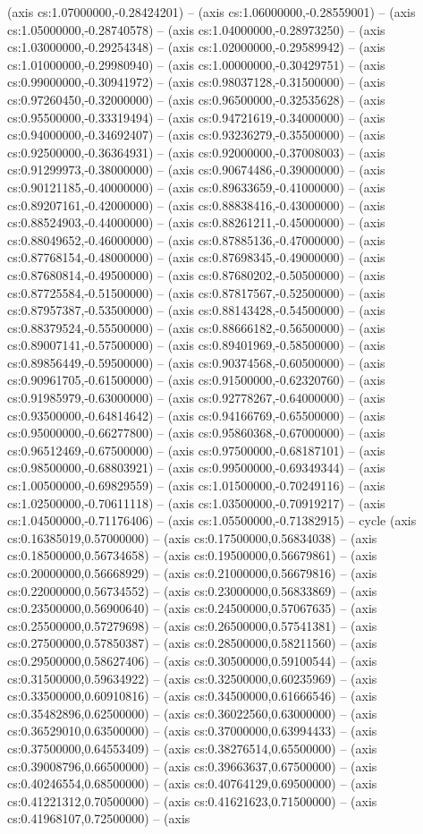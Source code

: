 (axis cs:1.07000000,-0.28424201) -- (axis cs:1.06000000,-0.28559001) -- (axis cs:1.05000000,-0.28740578) -- (axis cs:1.04000000,-0.28973250) -- (axis cs:1.03000000,-0.29254348) -- (axis cs:1.02000000,-0.29589942) -- (axis cs:1.01000000,-0.29980940) -- (axis cs:1.00000000,-0.30429751) -- (axis cs:0.99000000,-0.30941972) -- (axis cs:0.98037128,-0.31500000) -- (axis cs:0.97260450,-0.32000000) -- (axis cs:0.96500000,-0.32535628) -- (axis cs:0.95500000,-0.33319494) -- (axis cs:0.94721619,-0.34000000) -- (axis cs:0.94000000,-0.34692407) -- (axis cs:0.93236279,-0.35500000) -- (axis cs:0.92500000,-0.36364931) -- (axis cs:0.92000000,-0.37008003) -- (axis cs:0.91299973,-0.38000000) -- (axis cs:0.90674486,-0.39000000) -- (axis cs:0.90121185,-0.40000000) -- (axis cs:0.89633659,-0.41000000) -- (axis cs:0.89207161,-0.42000000) -- (axis cs:0.88838416,-0.43000000) -- (axis cs:0.88524903,-0.44000000) -- (axis cs:0.88261211,-0.45000000) -- (axis cs:0.88049652,-0.46000000) -- (axis cs:0.87885136,-0.47000000) -- (axis cs:0.87768154,-0.48000000) -- (axis cs:0.87698345,-0.49000000) -- (axis cs:0.87680814,-0.49500000) -- (axis cs:0.87680202,-0.50500000) -- (axis cs:0.87725584,-0.51500000) -- (axis cs:0.87817567,-0.52500000) -- (axis cs:0.87957387,-0.53500000) -- (axis cs:0.88143428,-0.54500000) -- (axis cs:0.88379524,-0.55500000) -- (axis cs:0.88666182,-0.56500000) -- (axis cs:0.89007141,-0.57500000) -- (axis cs:0.89401969,-0.58500000) -- (axis cs:0.89856449,-0.59500000) -- (axis cs:0.90374568,-0.60500000) -- (axis cs:0.90961705,-0.61500000) -- (axis cs:0.91500000,-0.62320760) -- (axis cs:0.91985979,-0.63000000) -- (axis cs:0.92778267,-0.64000000) -- (axis cs:0.93500000,-0.64814642) -- (axis cs:0.94166769,-0.65500000) -- (axis cs:0.95000000,-0.66277800) -- (axis cs:0.95860368,-0.67000000) -- (axis cs:0.96512469,-0.67500000) -- (axis cs:0.97500000,-0.68187101) -- (axis cs:0.98500000,-0.68803921) -- (axis cs:0.99500000,-0.69349344) -- (axis cs:1.00500000,-0.69829559) -- (axis cs:1.01500000,-0.70249116) -- (axis cs:1.02500000,-0.70611118) -- (axis cs:1.03500000,-0.70919217) -- (axis cs:1.04500000,-0.71176406) -- (axis cs:1.05500000,-0.71382915) -- cycle (axis cs:0.16385019,0.57000000) -- (axis cs:0.17500000,0.56834038) -- (axis cs:0.18500000,0.56734658) -- (axis cs:0.19500000,0.56679861) -- (axis cs:0.20000000,0.56668929) -- (axis cs:0.21000000,0.56679816) -- (axis cs:0.22000000,0.56734552) -- (axis cs:0.23000000,0.56833869) -- (axis cs:0.23500000,0.56900640) -- (axis cs:0.24500000,0.57067635) -- (axis cs:0.25500000,0.57279698) -- (axis cs:0.26500000,0.57541381) -- (axis cs:0.27500000,0.57850387) -- (axis cs:0.28500000,0.58211560) -- (axis cs:0.29500000,0.58627406) -- (axis cs:0.30500000,0.59100544) -- (axis cs:0.31500000,0.59634922) -- (axis cs:0.32500000,0.60235969) -- (axis cs:0.33500000,0.60910816) -- (axis cs:0.34500000,0.61666546) -- (axis cs:0.35482896,0.62500000) -- (axis cs:0.36022560,0.63000000) -- (axis cs:0.36529010,0.63500000) -- (axis cs:0.37000000,0.63994433) -- (axis cs:0.37500000,0.64553409) -- (axis cs:0.38276514,0.65500000) -- (axis cs:0.39008796,0.66500000) -- (axis cs:0.39663637,0.67500000) -- (axis cs:0.40246554,0.68500000) -- (axis cs:0.40764129,0.69500000) -- (axis cs:0.41221312,0.70500000) -- (axis cs:0.41621623,0.71500000) -- (axis cs:0.41968107,0.72500000) -- (axis 